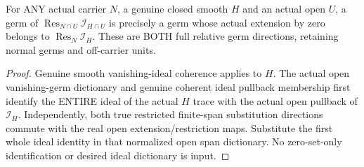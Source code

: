 \begin{lemma}
\label{hir:sharp-actual-normalized-vanishing-open-full-germ-dictionary}
\leanok
For ANY actual carrier $N$, a genuine closed smooth $H$ and an actual
open $U$, a germ of $\operatorname{Res}_{N\cap U}\mathcal I_{H\cap U}$
is precisely a germ whose actual extension by zero belongs to
$\operatorname{Res}_N\mathcal I_H$. These are BOTH full relative germ
directions, retaining normal germs and off-carrier units.
\end{lemma}
\begin{proof}
Genuine smooth vanishing-ideal coherence applies to $H$. The actual
open vanishing-germ dictionary and genuine coherent ideal pullback
membership first identify the ENTIRE ideal of the actual $H$ trace with
the actual open pullback of $\mathcal I_H$. Independently, both true
restricted finite-span substitution directions commute with the real
open extension/restriction maps. Substitute the first whole ideal identity
in that normalized open span dictionary. No zero-set-only identification
or desired ideal dictionary is input.
\end{proof}

